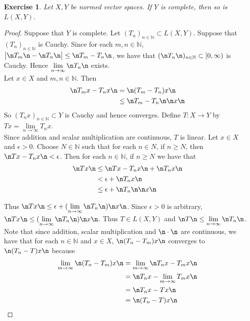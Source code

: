 \documentclass[12pt]{amsart}
\newtheorem{ex}[thm]{Exercise}
\newcommand{\ep}{\epsilon}
\newcommand{\N}{\mathbb{N}}
\newcommand{\Rg}{[0,\infty)}
\newcommand{\limn}{\lim \limits_{n \rightarrow \infty}}
\begin{document}
\begin{ex}
	Let $X,Y$ be normed vector spaces. If $Y$ is complete, then so is $L(X,Y)$.
\end{ex}

\begin{proof}
	Suppose that $Y$ is complete. Let $(T_n)_{n \in \N} \subset L(X,Y)$. Suppose that $(T_n)_{n \in \N}$ is Cauchy. Since for each $m,n \in \N$, $\big\vert \n T_m \n - \n T_n \n \big\vert \leq \n T_m -T_n \n$, we have that $(\n T_n \n )_{n \in \N} \subset \Rg$ is Cauchy. Hence $\lim\limits_{n \rightarrow \infty}\n T_n \n$ exists. \vspace{1cm} \\ Let $x \in X$ and $m,n \in \N$. Then 
	\begin{align*}
		\n T_m x - T_n x \n 
		&= \n (T_m-T_n) x \n \\
		&\leq \n T_m-T_n \n \n x \n
	\end{align*}
	So $(T_nx)_{n \in \N} \subset Y$ is Cauchy and hence converges. Define $T:X \rightarrow Y$ by $Tx = \lim\limits_{n \rightarrow \infty} T_nx$. \vspace{1cm}\\
	Since addition and scalar multiplication are continuous, $T$ is linear. Let $x \in X$ and $\ep>0$. Choose $N \in \N$ such that for each $n \in N$, if $n \geq N$, then $\n Tx - T_n x\n < \ep$. Then for each $n \in \N$, if $n \geq N$ we have that 
	\begin{align*}
		\n Tx\n 
		&\leq \n Tx-T_nx \n + \n T_nx \n\\
		&< \ep + \n T_nx \n\\
		&\leq \ep + \n T_n \n \n x \n 
	\end{align*}  
	
	Thus $\n Tx \n \leq \ep +(\lim\limits_{n \rightarrow \infty} \n T_n \n) \n x \n$. Since $\ep >0$ is arbitrary, $\n Tx \n \leq (\lim\limits_{n \rightarrow \infty} \n T_n \n) \n x \n$. Thus $T \in L(X,Y)$ and $\n T \n \leq \limn \n T_n \n$. \vspace{1cm} \\
	Note that since addition, scalar multiplication and $\n \cdot \n$ are continuous, we have that for each $n \in \N$ and $x \in X$, $\n (T_n-T_m)x \n $ converges to $\n (T_n-T)x \n$ because 
	\begin{align*}
		\lim_{m \rightarrow \infty} \n (T_n-T_m)x \n
		&= \lim_{m \rightarrow \infty} \n T_nx-T_mx \n\\
		&= \n T_nx-\lim_{m \rightarrow \infty}T_mx \n\\
		&=\n T_nx-Tx \n\\
		&= \n (T_n-T)x \n
	\end{align*} 
	

\end{proof}
\end{document}
